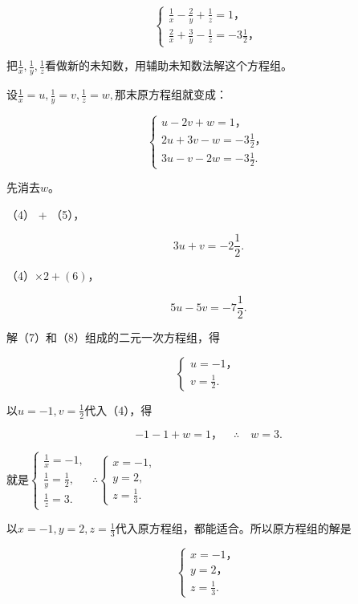 \[
\left\{ \begin{array}{l} \frac{1}{x} - \frac{2}{y} + \frac{1}{z} = 1\text{，} \\ \frac{2}{x} + \frac{3}{y} - \frac{1}{z} = - 3 \frac{1}{2}\text{，} \end{array} \right. \tag{3}
\]

把\(\frac{1}{x}, \frac{1}{y}, \frac{1}{z}\)看做新的未知数，用辅助未知数法解这个方程组。

设\(\frac{1}{x} = u, \frac{1}{y} = v, \frac{1}{z} = w,\)那末原方程组就变成：

\[
\left\{ \begin{array}{l} u - 2 v + w = 1\text{，} \\ 2 u + 3 v - w = - 3 \frac{1}{2}\text{，} \\ 3 u - v - 2 w = - 3 \frac{1}{2}. \end{array} \right. \tag{4}
\]

先消去\(w\)。

（4） + （5），

\[
3 u + v = - 2 \frac{1}{2}. \tag{7}
\]

（4）\(\times 2 + (6)\)，

\[
5 u - 5 v = - 7 \frac{1}{2}. \tag{8}
\]

解（7）和（8）组成的二元一次方程组，得

\[
\left\{ \begin{array}{l} u = - 1\text{，} \\ v = \frac{1}{2}. \end{array} \right.
\]

以\(u = -1, v = \frac{1}{2}\)代入（4），得

\[
- 1 - 1 + w = 1\text{，} \quad \therefore \quad w = 3.
\]

就是\(\left\{ \begin{array}{l} \frac{1}{x} = -1, \\ \frac{1}{y} = \frac{1}{2}, \\ \frac{1}{z} = 3. \end{array} \right.\) \(\therefore \left\{ \begin{array}{l} x = -1, \\ y = 2, \\ z = \frac{1}{3}. \end{array} \right.\)

以\(x = -1, y = 2, z = \frac{1}{3}\)代入原方程组，都能适合。所以原方程组的解是

\[
\left\{ \begin{array}{l} x = - 1\text{，} \\ y = 2\text{，} \\ z = \frac{1}{3}. \end{array} \right.
\]

